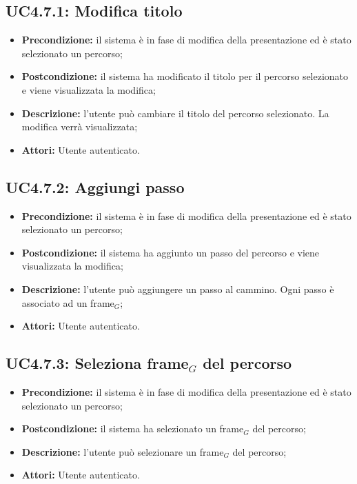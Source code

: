 \subsection{ UC4.7.1: Modifica titolo }

\begin{itemize}
	\item \textbf{Precondizione:} il sistema è in fase di modifica della presentazione ed è stato selezionato un percorso;
	\item \textbf{Postcondizione:} il sistema ha modificato il titolo per il percorso selezionato e viene visualizzata la modifica;
	\item \textbf{Descrizione:} l'utente può cambiare il titolo del percorso selezionato. La modifica verrà visualizzata;
	\item \textbf{Attori:} Utente autenticato.
\end{itemize}
\subsection{ UC4.7.2: Aggiungi passo}

\begin{itemize}
	\item \textbf{Precondizione:} il sistema è in fase di modifica della presentazione ed è stato selezionato un percorso;
	\item \textbf{Postcondizione:} il sistema ha aggiunto un passo del percorso e viene visualizzata la modifica;
	\item \textbf{Descrizione:} l'utente può aggiungere un passo al cammino. Ogni passo è associato ad un frame$_G$;
	\item \textbf{Attori:} Utente autenticato.
\end{itemize}
\subsection{ UC4.7.3: Seleziona frame$_G$ del percorso}

\begin{itemize}
	\item \textbf{Precondizione:} il sistema è in fase di modifica della presentazione ed è stato selezionato un percorso;
	\item \textbf{Postcondizione:} il sistema ha selezionato un frame$_G$ del percorso;
	\item \textbf{Descrizione:} l'utente può selezionare un frame$_G$ del percorso;
	\item \textbf{Attori:} Utente autenticato.
\end{itemize}
